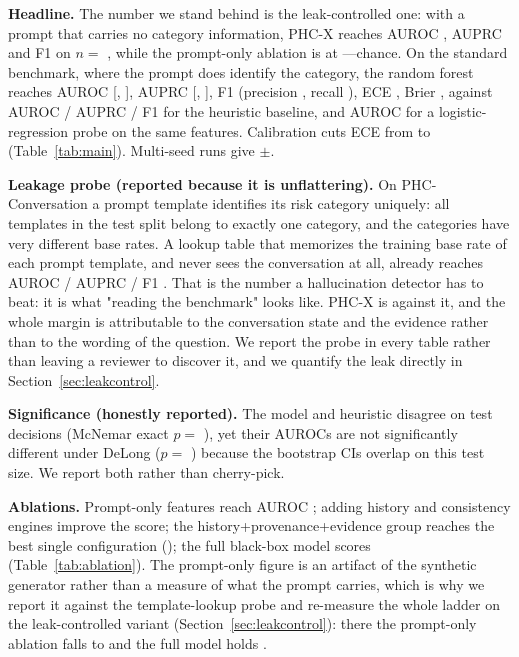 \documentclass[10pt]{article}
\begin{document}
\textbf{Headline.} The number we stand behind is the leak-controlled one: with
a prompt that carries no category information, PHC-X reaches AUROC \lcauc{},
AUPRC \lcauprc{} and F1 \lcfone{} on $n=$ \lcntest, while the prompt-only
ablation is at \lcprompt{}---chance. On the standard benchmark, where the
prompt does identify the category, the random forest reaches AUROC \auroc{}
[\auroclo, \aurochi], AUPRC \auprc{} [\auprclo, \auprchi], F1 \fone{}
(precision \precis, recall \recla), ECE \ece, Brier \brier, against AUROC
\hauroc{} / AUPRC \hauprc{} / F1 \hfone{} for the heuristic baseline, and
AUROC \lrauroc{} for a logistic-regression probe on the same features.
Calibration cuts ECE from \uece{} to \ece{} (Table~\ref{tab:main}).
Multi-seed runs give \msmean{}$\pm$\msstd.

\textbf{Leakage probe (reported because it is unflattering).} On
PHC-Conversation a prompt template identifies its risk category uniquely:
all \ntemplates{} templates in the test split belong to exactly one
category, and the categories have very different base rates. A lookup table
that memorizes the training base rate of each prompt template, and never
sees the conversation at all, already reaches AUROC \lookupauroc{} /
AUPRC \lookupauprc{} / F1 \lookupfone{}. That is the number a
hallucination detector has to beat: it is what "reading the benchmark"
looks like. PHC-X is \auroc{} against it, and the whole margin is
attributable to the conversation state and the evidence rather than to the
wording of the question. We report the probe in every table rather than
leaving a reviewer to discover it, and we quantify the leak directly in
Section~\ref{sec:leakcontrol}.

\textbf{Significance (honestly reported).} The model and heuristic disagree
on \ndiscordant{} test decisions (McNemar exact $p=$ \pmcnemar), yet their
AUROCs are not significantly different under DeLong ($p=$ \pdelong) because
the bootstrap CIs overlap on this test size. We report both rather than
cherry-pick.

\textbf{Ablations.} Prompt-only features reach AUROC \promptauroc; adding
history and consistency engines improve the score; the
history+provenance+evidence group reaches the best single configuration
(\evidenceauroc); the full black-box model scores \auroc
(Table~\ref{tab:ablation}). The prompt-only figure is an artifact of the
synthetic generator rather than a measure of what the prompt carries, which
is why we report it against the template-lookup probe and re-measure the
whole ladder on the leak-controlled variant
(Section~\ref{sec:leakcontrol}): there the prompt-only ablation falls to
\lcprompt{} and the full model holds \lcauc{}.
\end{document}
